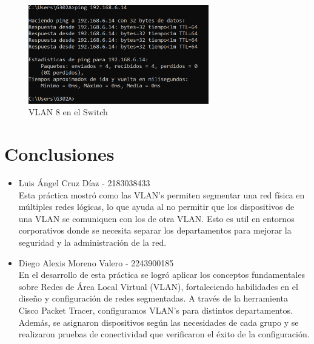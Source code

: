         \begin{figure}[H]
            \centering
            \includegraphics[width=0.7\textwidth]{img/ping_vlan8.png}
            \caption{VLAN 8 en el Switch}
            \label{fig:ping_vlan8}
        \end{figure}

\section{Conclusiones}
    \begin{itemize}
        \item Luis Ángel Cruz Díaz - 2183038433 \\
        Esta práctica mostró como las VLAN's permiten segmentar una red física en múltiples redes lógicas, lo que ayuda al no permitir que los dispositivos de una VLAN se comuniquen con los de otra VLAN. Esto es util en entornos corporativos donde se necesita separar los departamentos para mejorar la seguridad y la administración de la red.
        \item Diego Alexis Moreno Valero - 2243900185 \\
        En el desarrollo de esta práctica se logró aplicar los conceptos fundamentales sobre Redes de Área Local Virtual (VLAN), fortaleciendo habilidades en el diseño y configuración de redes segmentadas. A través de la herramienta Cisco Packet Tracer, configuramos VLAN's para distintos departamentos. Además, se asignaron dispositivos según las necesidades de cada grupo y se realizaron pruebas de conectividad que verificaron el éxito de la configuración.
    \end{itemize}
    
